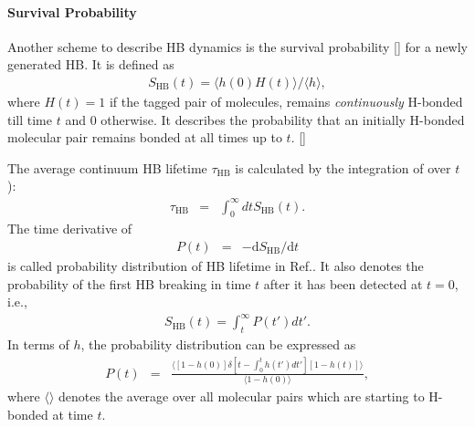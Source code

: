 \paragraph{Survival Probability}
Another scheme to describe HB dynamics is the survival probability [\cite{AC00}] for a newly generated HB.
It is defined as
\begin{eqnarray}
S_{\text{HB}}(t)=\langle h(0)H(t) \rangle/\langle h\rangle 
\label{eq:S_HB},
\end{eqnarray}
where $H(t)=1$ if the tagged pair of molecules, remains \emph{continuously} H-bonded till time $t$ 
and 0 otherwise.  It describes the probability that an initially H-bonded molecular pair 
remains bonded at all times up to $t$. [\cite{Chowdhuri2006}]

The average continuum HB lifetime $\tau_{\text{HB}}$ is calculated by the integration of \SHB over $t$):  
\begin{eqnarray}
  \tau_{\text{HB}} &=& \int_0^\infty dt S_{\text{HB}}(t).
\label{eq:calculate_hb_lifetime}
\end{eqnarray}
%
The time derivative of \SHB
\begin{eqnarray}
P(t) &=& -\text{d}S_{\text{HB}}/\text{d}t
\label{eq:P_1}
\end{eqnarray}
is called probability distribution of HB lifetime in Ref.\cite{Sciortino1990prl,FWS99}. 
It also denotes the probability of the first HB breaking in time $t$ after it has been detected at $t=0$, i.e.,
\begin{eqnarray}
S_{\text{HB}}(t)= \int_t^\infty P(t')dt'.
\label{eq:P_2}
\end{eqnarray}
%
In terms of $h$, the probability distribution can be expressed as
\begin{eqnarray}
P(t) &=& \frac{\langle [1-h(0)]\delta [t-\int_0^t h(t')dt'][1-h(t)]\rangle}{\langle 1-h(0)\rangle},
\label{eq:P_3}
\end{eqnarray}
where $\langle \rangle$ denotes the average over all molecular pairs which are starting to H-bonded at time $t$.

